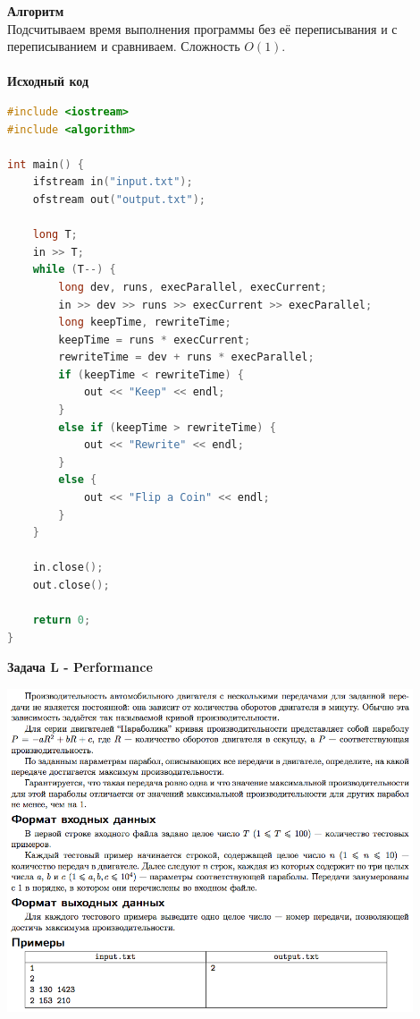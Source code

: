 \documentclass[a4paper,12pt]{article}
\begin{document}
\textbf{{\large Алгоритм}} \\
Подсчитываем время выполнения программы без её переписывания и с переписыванием и сравниваем. Сложность $O(1)$. \\ 
\\
\textbf{{\large Исходный код}}
\begin{lstlisting}[language=C++]
#include <iostream>
#include <algorithm>

int main() {
    ifstream in("input.txt");
    ofstream out("output.txt");

    long T;
    in >> T;
    while (T--) {
        long dev, runs, execParallel, execCurrent;
        in >> dev >> runs >> execCurrent >> execParallel;
        long keepTime, rewriteTime;
        keepTime = runs * execCurrent;
        rewriteTime = dev + runs * execParallel;
        if (keepTime < rewriteTime) {
            out << "Keep" << endl;
        }
        else if (keepTime > rewriteTime) {
            out << "Rewrite" << endl;
        }
        else {
            out << "Flip a Coin" << endl;
        }
    }

    in.close();
    out.close();

    return 0;
}
\end{lstlisting}
\newpage
\textbf{{\large Задача L - Performance}} \\
\begin{center}
\includegraphics[width=0.9\textwidth]{OC_Udmurtia/OC_Udmurtia_L.png}\\ [1cm]
\end{center}
\newpage
\end{document}
